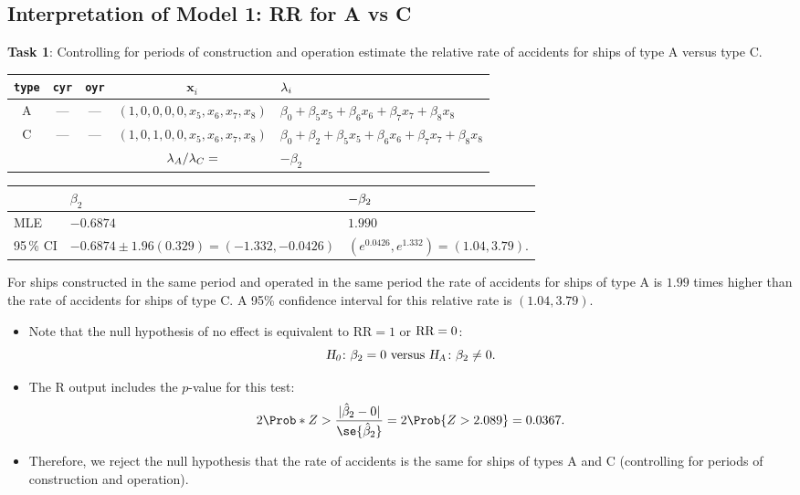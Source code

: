 \documentclass{article}\usepackage[]{graphicx}\usepackage[svgnames]{xcolor}
\let\exp\relax%
\let\log\relax%
\newcommand{\HN}{\textsl{H}_{\textsl{0}}}%
\newcommand{\HA}{\textsl{H}_{\textsl{A}}}%
\newcommand{\RR}{\text{RR}}%
\DeclarePairedDelimiter\abs{\lvert}{\rvert}
\providecommand{\Vector}[1]{\bm{#1}}%
\begin{document}
\subsection*{Interpretation of Model 1: RR for A vs C}
\begin{Example}{}
    \textbf{Task 1}: Controlling for periods of construction and operation estimate the relative rate of
    accidents for ships of type A versus type C.
\end{Example}
\begin{table}[H]
    \centering
    \begin{tabular}{ccccl}
        \texttt{type} & \texttt{cyr} & \texttt{oyr} & $ \Vector{x}_i $                & $ \log{\lambda_i} $                                             \\
        \midrule
        A             & ---          & ---          & $ (1,0,0,0,0,x_5,x_6,x_7,x_8) $ & $ \beta_0+\beta_5x_5+\beta_6x_6+\beta_7x_7+\beta_8x_8 $         \\
        C             & ---          & ---          & $ (1,0,1,0,0,x_5,x_6,x_7,x_8) $ & $ \beta_0+\beta_2+\beta_5x_5+\beta_6x_6+\beta_7x_7+\beta_8x_8 $ \\
        \midrule
                      &              &              & $ \log{\lambda_A/\lambda_C}= $  & $ -\beta_2 $
    \end{tabular}
\end{table}
\begin{table}[H]
    \centering
    \begin{tabular}{lll}
                  & $ \beta_2 $                                 & $ \exp{-\beta_2} $                      \\
        \midrule
        MLE       & $ -0.6874 $                                 & $ 1.990 $                               \\
        95\,\% CI & $ -0.6874\pm 1.96(0.329)=(-1.332,-0.0426) $ & $ (e^{0.0426},e^{1.332})=(1.04,3.79) $.
    \end{tabular}
\end{table}
For ships constructed in the same period and operated in the same period the rate of
accidents for ships of type A is $1.99$ times higher than the rate of accidents for ships of
type C. A 95\% confidence interval for this relative rate is $(1.04, 3.79)$.
\begin{itemize}
    \item Note that the null hypothesis of no effect is equivalent to $ \RR=1 $ or $ \log{\RR}=0 $:
          \[ \HN\colon \beta_2=0\text{ versus }\HA\colon \beta_2\ne 0. \]
    \item The R output includes the $ p $-value for this test:
          \[ 2\Prob*{Z>\frac{\abs{\hat{\beta}_2-0}}{\se{\hat{\beta}_2}}}=2\Prob{Z>2.089}=0.0367. \]
    \item Therefore, we reject the null hypothesis that the rate of accidents is the same for
          ships of types A and C (controlling for periods of construction and operation).
\end{itemize}
\end{document}
